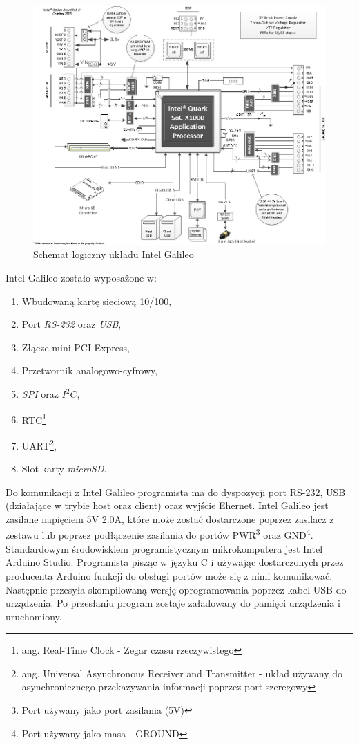 \documentclass{xmgr}
\begin{document}
\begin{figure}[!h]
    \centering
    \includegraphics[height=0.6\textwidth]{images/IntelGalileoLogicSchematics.jpg}
    \caption{Schemat logiczny układu Intel Galileo\label{IntelGalileoLogicSchematics}}
\end{figure}

Intel Galileo zostało wyposażone w:
\begin{enumerate}
  \item Wbudowaną kartę sieciową 10/100, 
  \item Port \emph{RS-232} oraz \emph{USB},
  \item Złącze mini PCI Express,
  \item Przetwornik analogowo-cyfrowy,
  \item \emph{SPI} oraz $I^2C$,
  \item RTC\footnote{ang. Real-Time Clock - Zegar czasu rzeczywistego}
  \item UART\footnote{ang. Universal Asynchronous Receiver and Transmitter - układ używany do asynchronicznego przekazywania informacji poprzez port szeregowy},
  \item Slot karty \emph{microSD}.\cite{GalileoBook}
\end{enumerate}

Do komunikacji z Intel Galileo programista ma do dyspozycji port RS-232, USB (działające w trybie host oraz client) oraz wyjście Ehernet. Intel Galileo jest zasilane napięciem 5V 2.0A, które może zostać dostarczone poprzez zasilacz z zestawu lub poprzez podłączenie zasilania do portów PWR\footnote{Port używany jako port zasilania (5V)} oraz GND\footnote{Port używany jako masa - GROUND}. Standardowym środowiskiem programistycznym mikrokomputera jest Intel Arduino Studio. Programista pisząc w języku C i używając dostarczonych przez producenta Arduino funkcji do obsługi portów może się z nimi komunikować. Następnie przesyła skompilowaną wersję oprogramowania poprzez kabel USB do urządzenia. Po przesłaniu program zostaje załadowany do pamięci urządzenia i uruchomiony. 
\end{document}
